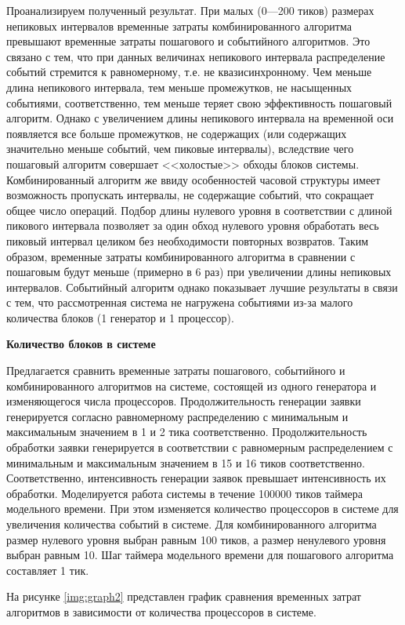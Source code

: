 Проанализируем полученный результат. При малых (0---200 тиков) размерах непиковых интервалов временные затраты комбинированного алгоритма превышают временные затраты пошагового и событийного алгоритмов. Это связано с тем, что при данных величинах непикового интервала распределение событий стремится к равномерному, т.е. не квазисинхронному. Чем меньше длина непикового интервала, тем меньше промежутков, не насыщенных событиями, соответственно, тем меньше теряет свою эффективность пошаговый алгоритм. Однако с увеличением длины непикового интервала на временной оси появляется все больше промежутков, не содержащих (или содержащих значительно меньше событий, чем пиковые интервалы), вследствие чего пошаговый алгоритм совершает <<холостые>> обходы блоков системы. Комбинированный алгоритм же ввиду особенностей часовой структуры имеет возможность пропускать интервалы, не содержащие событий, что сокращает общее число операций. Подбор длины нулевого уровня в соответствии с длиной пикового интервала позволяет за один обход нулевого уровня обработать весь пиковый интервал целиком без необходимости повторных возвратов. Таким образом, временные затраты комбинированного алгоритма в сравнении с пошаговым будут меньше (примерно в 6 раз) при увеличении длины непиковых интервалов.
Событийный алгоритм однако показывает лучшие результаты в связи с тем, что рассмотренная система не нагружена событиями из-за малого количества блоков (1 генератор и 1 процессор).


\textbf{Количество блоков в системе}

Предлагается сравнить временные затраты пошагового, событийного и комбинированного алгоритмов на системе, состоящей из одного генератора и изменяющегося числа процессоров. Продолжительность генерации заявки генерируется согласно равномерному распределению с минимальным и максимальным значением в 1 и 2 тика соответственно. Продолжительность обработки заявки генерируется в соответствии с равномерным распределением с минимальным и максимальным значением в 15 и 16 тиков соответственно. Соответственно, интенсивность генерации заявок превышает интенсивность их обработки. Моделируется работа системы в течение 100000 тиков таймера модельного времени. При этом изменяется количество процессоров в системе для увеличения количества событий в системе. Для комбинированного алгоритма размер нулевого уровня выбран равным 100 тиков, а размер ненулевого уровня выбран равным 10. Шаг таймера модельного времени для пошагового алгоритма составляет 1 тик.

На рисунке \ref{img:graph2} представлен график сравнения временных затрат алгоритмов в зависимости от количества процессоров в системе.

